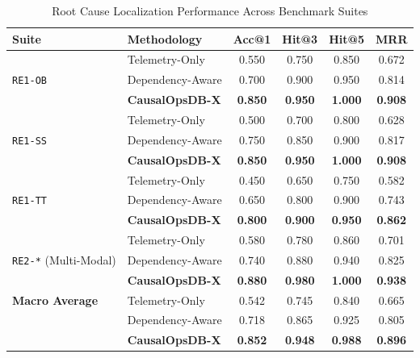 \documentclass[conference]{IEEEtran}
\begin{document}
\begin{table}[t]
\centering
\caption{Root Cause Localization Performance Across Benchmark Suites}
\label{tab:evaluation_results}
\begin{tabular}{@{}llcccc@{}}
\toprule
\textbf{Suite} & \textbf{Methodology} & \textbf{Acc@1} & \textbf{Hit@3} & \textbf{Hit@5} & \textbf{MRR} \\
\midrule
\multirow{3}{*}{\texttt{RE1-OB}} 
  & Telemetry-Only    & 0.550 & 0.750 & 0.850 & 0.672 \\
  & Dependency-Aware  & 0.700 & 0.900 & 0.950 & 0.814 \\
  & \textbf{CausalOpsDB-X} & \textbf{0.850} & \textbf{0.950} & \textbf{1.000} & \textbf{0.908} \\
\midrule
\multirow{3}{*}{\texttt{RE1-SS}} 
  & Telemetry-Only    & 0.500 & 0.700 & 0.800 & 0.628 \\
  & Dependency-Aware  & 0.750 & 0.850 & 0.900 & 0.817 \\
  & \textbf{CausalOpsDB-X} & \textbf{0.850} & \textbf{0.950} & \textbf{1.000} & \textbf{0.908} \\
\midrule
\multirow{3}{*}{\texttt{RE1-TT}} 
  & Telemetry-Only    & 0.450 & 0.650 & 0.750 & 0.582 \\
  & Dependency-Aware  & 0.650 & 0.800 & 0.900 & 0.743 \\
  & \textbf{CausalOpsDB-X} & \textbf{0.800} & \textbf{0.900} & \textbf{0.950} & \textbf{0.862} \\
\midrule
\multirow{3}{*}{\texttt{RE2-*} (Multi-Modal)} 
  & Telemetry-Only    & 0.580 & 0.780 & 0.860 & 0.701 \\
  & Dependency-Aware  & 0.740 & 0.880 & 0.940 & 0.825 \\
  & \textbf{CausalOpsDB-X} & \textbf{0.880} & \textbf{0.980} & \textbf{1.000} & \textbf{0.938} \\
\midrule
\textbf{Macro Average} 
  & Telemetry-Only    & 0.542 & 0.745 & 0.840 & 0.665 \\
  & Dependency-Aware  & 0.718 & 0.865 & 0.925 & 0.805 \\
  & \textbf{CausalOpsDB-X} & \textbf{0.852} & \textbf{0.948} & \textbf{0.988} & \textbf{0.896} \\
\bottomrule
\end{tabular}
\vspace{-1.0em}
\end{table}
\end{document}

